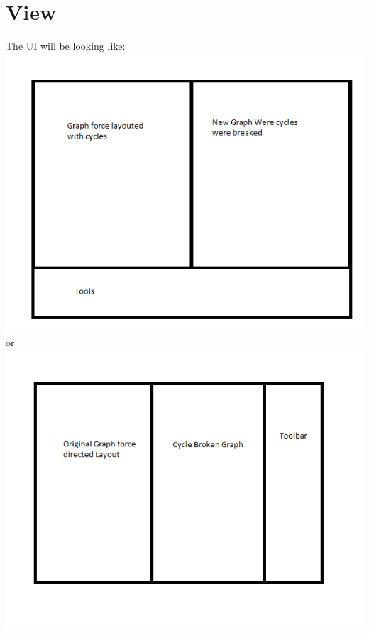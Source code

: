 \section{View}
The UI will be looking like: \\
\includegraphics[scale=0.5]{parts/UIToolbarBottom}
or 
\includegraphics[scale=0.5]{parts/UIToolbarRight}\\
